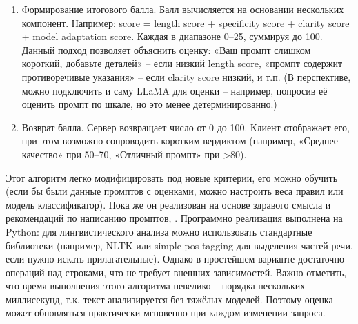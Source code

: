 \begin{enumerate}[label=\arabic*.]
    \item Формирование итогового балла. Балл вычисляется на основании нескольких компонент. Например: score = length score + specificity score + clarity score + model adaptation score. Каждая в диапазоне 0–25, суммируя до 100. Данный подход позволяет объяснить оценку: «Ваш промпт слишком короткий, добавьте деталей» – если низкий length score, «промпт содержит противоречивые указания» – если clarity score низкий, и т.п. (В перспективе, можно подключить и саму LLaMA для оценки – например, попросив её оценить промпт по шкале, но это менее детерминированно.)
    \item Возврат балла. Сервер возвращает число от 0 до 100. Клиент отображает его, при этом возможно сопроводить коротким вердиктом (например, «Среднее качество» при 50–70, «Отличный промпт» при >80).
\end{enumerate}
Этот алгоритм легко модифицировать под новые критерии, его можно обучить (если бы были данные промптов с оценками, можно настроить веса правил или модель классификатор). Пока же он реализован на основе здравого смысла и рекомендаций по написанию промптов\cite{vc:prompt}, \cite{promptingguide:basics}. Программно реализация выполнена на Python: для лингвистического анализа можно использовать стандартные библиотеки (например, NLTK или simple pos-tagging для выделения частей речи, если нужно искать прилагательные). Однако в простейшем варианте достаточно операций над строками, что не требует внешних зависимостей. Важно отметить, что время выполнения этого алгоритма невелико – порядка нескольких миллисекунд, т.к. текст анализируется без тяжёлых моделей. Поэтому оценка может обновляться практически мгновенно при каждом изменении запроса.

